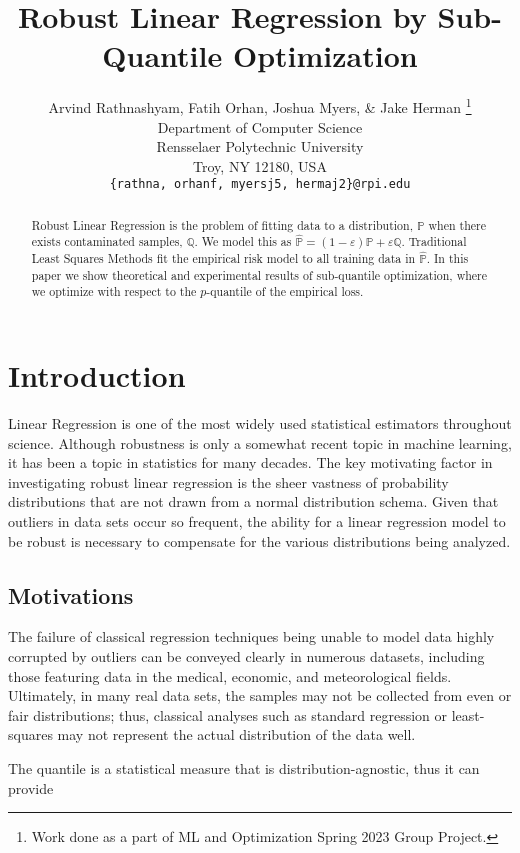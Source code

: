 \documentclass{article} %
\title{Robust Linear Regression by Sub-Quantile Optimization}
\author{Arvind Rathnashyam, Fatih Orhan, Joshua Myers, \& Jake Herman  \thanks{ Work done as a part of ML and Optimization Spring 2023 Group Project.} \\
	Department of Computer Science\\
	Rensselaer Polytechnic University\\
	Troy, NY 12180, USA \\
	\texttt{\{rathna, orhanf, myersj5, hermaj2\}@rpi.edu} \\
}
\begin{document}
	
	\maketitle
	
	\begin{abstract}
		Robust Linear Regression is the problem of fitting data to a distribution, $\displaystyle \mathbb{P}$ when there exists contaminated samples, $\displaystyle \mathbb{Q}$. We model this as $\displaystyle \hat{\mathbb{P}} = (1-\varepsilon)\mathbb{P} + \varepsilon\mathbb{Q}$. Traditional Least Squares Methods fit the empirical risk model to all training data in $\displaystyle \hat{\mathbb{P}}$. In this paper we show theoretical and experimental results of sub-quantile optimization, where we optimize with respect to the $p$-quantile of the empirical loss.
	\end{abstract}
	
	\section{Introduction}
	
	Linear Regression is one of the most widely used statistical estimators throughout science. Although robustness is only a somewhat recent topic in machine learning, it has been a topic in statistics for many decades. The key motivating factor in investigating robust linear regression is the sheer vastness of probability distributions that are not drawn from a normal distribution schema. Given that outliers in data sets occur so frequent, the ability for a linear regression model to be robust is necessary to compensate for the various distributions being analyzed. 
	\subsection{Motivations}
	The failure of classical regression techniques being unable to model data highly corrupted by outliers can be conveyed clearly in numerous datasets, including those featuring data in the medical, economic, and meteorological fields. Ultimately, in many real data sets, the samples may not be collected from even or fair distributions; thus, classical analyses such as standard regression or least-squares may not represent the actual distribution of the data well. 
	
	The quantile is a statistical measure that is distribution-agnostic, thus it can provide 
	
\end{document}
